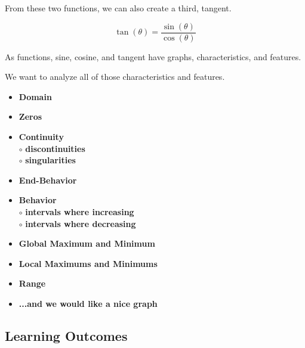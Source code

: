\documentclass{ximera}
\begin{document}
From these two functions, we can also create a third, tangent.

\[       
\tan(\theta) = \frac{\sin(\theta)}{\cos(\theta)}
\]



As functions, sine, cosine, and tangent have graphs, characteristics, and features.


We want to analyze all of those characteristics and features.



\begin{itemize}
     \item \textbf{\textcolor{red!70!black}{Domain}} 
     \item \textbf{\textcolor{red!70!black}{Zeros}} 
     \item \textbf{\textcolor{red!70!black}{Continuity}} \\
     \text{    }$\circ$ \textbf{\textcolor{purple!85!blue}{discontinuities}}\\
     \text{    }$\circ$ \textbf{\textcolor{purple!85!blue}{singularities}}\\
     \item \textbf{\textcolor{red!70!black}{End-Behavior}} 
     \item \textbf{\textcolor{red!70!black}{Behavior}} \\
     \text{    }$\circ$ \textbf{\textcolor{purple!85!blue}{intervals where increasing}}\\
     \text{    }$\circ$ \textbf{\textcolor{purple!85!blue}{intervals where decreasing}}\\
     \item \textbf{\textcolor{red!70!black}{Global Maximum and Minimum}} 
     \item \textbf{\textcolor{red!70!black}{Local Maximums and Minimums}} 
     \item \textbf{\textcolor{red!70!black}{Range}} 
     \item \textbf{\textcolor{blue!55!black}{...and we would like a nice graph}} 
\end{itemize}

















\subsection*{Learning Outcomes}
\end{document}
